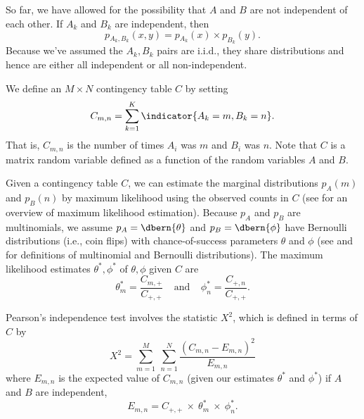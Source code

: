So far, we have allowed for the possibility that $A$ and $B$ are not
independent of each other.  If $A_k$ and $B_k$ are independent, then
%
\begin{equation}
p\!_{A_k,B_k}(x,y) = p\!_{A_k}(x) \times p_{B_k}(y).
\end{equation}
%
Because we've assumed the $A_k,B_k$ pairs are i.i.d., they share
distributions and hence are either all independent or all
non-independent.

We define an $M \times N$ contingency table $C$ by setting
%
\begin{equation}
C_{m,n} = \sum_{k=1}^K \indicator{A_k = m, B_k = n}.
\end{equation}
%
That is, $C_{m,n}$ is the number of times $A_i$ was $m$ and $B_i$ was
$n$.  Note that $C$ is a matrix random variable defined as a function
of the random variables $A$ and $B$.

Given a contingency table $C$, we can estimate the marginal
distributions $p_A(m)$ and $p_B(n)$ by maximum likelihood using the
observed counts in $C$ (see  for an overview of
maximum likelihood estimation).  Because $p_A$ and $p_B$ are
multinomials, we assume $p_A = \dbern{\theta}$ and $p_B =
\dbern{\phi}$ have Bernoulli distributions (i.e., coin flips) with
chance-of-success parameters $\theta$ and $\phi$ (see
 and  for
definitions of multinomial and Bernoulli distributions).  The maximum
likelihood estimates $\theta^*, \phi^*$ of $\theta,\phi$ given $C$ are
%
\begin{equation}
\theta^*_m = \frac{C_{m,+}}{C_{+,+}} 
\ \ \ \ \ \mbox{and} \ \ \ \ \ 
\phi^*_n = \frac{C_{+,n}}{C_{+,+}}.
\end{equation}

Pearson's independence test involves the statistic $X^2$, which is
defined in terms of $C$ by
%
\begin{equation}
X^2 
= \sum_{m=1}^M \ \sum_{n=1}^N 
  \frac{(C_{m,n} - E_{m,n})^2}
       {E_{m,n}}
\end{equation}
%
where $E_{m,n}$ is the expected value of $C_{m,n}$ (given our
estimates $\theta^*$ and $\phi^*$) if $A$ and $B$ are independent,
%
\begin{equation}
E_{m,n} = C_{+,+} \ \times \ \theta^*_m \ \times \ \phi^*_n.
\end{equation}

